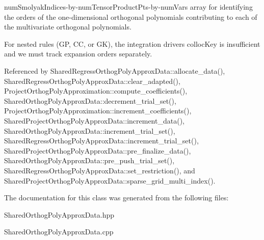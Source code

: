 num\+Smolyak\+Indices-\/by-\/num\+Tensor\+Product\+Pts-\/by-\/num\+Vars array for identifying the orders of the one-\/dimensional orthogonal polynomials contributing to each of the multivariate orthogonal polynomials. 

For nested rules (GP, CC, or GK), the integration driver\textquotesingle{}s colloc\+Key is insufficient and we must track expansion orders separately. 

Referenced by Shared\+Regress\+Orthog\+Poly\+Approx\+Data\+::allocate\+\_\+data(), Shared\+Regress\+Orthog\+Poly\+Approx\+Data\+::clear\+\_\+adapted(), Project\+Orthog\+Poly\+Approximation\+::compute\+\_\+coefficients(), Shared\+Orthog\+Poly\+Approx\+Data\+::decrement\+\_\+trial\+\_\+set(), Project\+Orthog\+Poly\+Approximation\+::increment\+\_\+coefficients(), Shared\+Project\+Orthog\+Poly\+Approx\+Data\+::increment\+\_\+data(), Shared\+Orthog\+Poly\+Approx\+Data\+::increment\+\_\+trial\+\_\+set(), Shared\+Regress\+Orthog\+Poly\+Approx\+Data\+::increment\+\_\+trial\+\_\+set(), Shared\+Project\+Orthog\+Poly\+Approx\+Data\+::pre\+\_\+finalize\+\_\+data(), Shared\+Orthog\+Poly\+Approx\+Data\+::pre\+\_\+push\+\_\+trial\+\_\+set(), Shared\+Regress\+Orthog\+Poly\+Approx\+Data\+::set\+\_\+restriction(), and Shared\+Project\+Orthog\+Poly\+Approx\+Data\+::sparse\+\_\+grid\+\_\+multi\+\_\+index().



The documentation for this class was generated from the following files\+:\begin{DoxyCompactItemize}
\item 
Shared\+Orthog\+Poly\+Approx\+Data.\+hpp\item 
Shared\+Orthog\+Poly\+Approx\+Data.\+cpp\end{DoxyCompactItemize}
